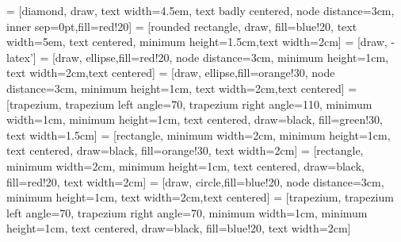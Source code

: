 \documentclass[fleqn,usenatbib]{mnras}
\begin{document}
 = [diamond, draw,
    text width=4.5em, text badly centered, node distance=3cm, inner sep=0pt,fill=red!20]
 = [rounded rectangle, draw, fill=blue!20, 
    text width=5em, text centered, minimum height=1.5cm,text width=2cm]
 = [draw, -latex']
 = [draw, ellipse,fill=red!20, node distance=3cm,
    minimum height=1cm,  text width=2cm,text centered]
     = [draw, ellipse,fill=orange!30, node distance=3cm,
    minimum height=1cm,  text width=2cm,text centered]
 = [trapezium, trapezium left angle=70, trapezium right angle=110, minimum width=1cm, minimum height=1cm, text centered, draw=black, fill=green!30,  text width=1.5cm]
 = [rectangle, minimum width=2cm, minimum height=1cm, text centered, draw=black, fill=orange!30,  text width=2cm]
 = [rectangle, minimum width=2cm, minimum height=1cm, text centered, draw=black, fill=red!20,  text width=2cm]
  = [draw, circle,fill=blue!20, node distance=3cm,
    minimum height=1cm,  text width=2cm,text centered]
 = [trapezium, trapezium left angle=70, trapezium right angle=70, minimum width=1cm, minimum height=1cm, text centered, draw=black,  fill=blue!20,  text width=2cm]
\end{document}
